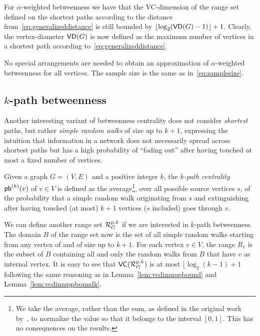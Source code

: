 For $\alpha$-weighted betweenness we have that the VC-dimension of the range set
defined on the shortest paths according to the distance
from~\eqref{eq:generalizeddistance} is still bounded by
$\lfloor\log_2(\mathsf{VD}(G)-1)\rfloor+1$. Clearly, the vertex-diameter $\mathsf{VD}(G)$ is now
defined as the maximum number of vertices in a shortest path according
to~\eqref{eq:generalizeddistance}.

No special arrangements are needed to obtain an approximation of
$\alpha$-weighted betweenness for all vertices. The sample size is the same as in~\eqref{eq:samplesize}.

\subsection{$k$-path betweenness}
Another interesting variant of betweenness centrality does not consider
\emph{shortest} paths, but rather \emph{simple random walks} of size up to
$k+1$, expressing the intuition that information in a network does not
necessarily spread across shortest paths but has a high probability of ``fading
out'' after having touched at most a fixed number of vertices.

\begin{definition}\label{def:kpathbetweenness}
 Given a graph $G=(V,E)$ and a positive integer $k$, the \emph{$k$-path
 centrality} $\mathsf{pb}^{(k)}(v)$ of $v\in V$ is defined as the average\footnote{We take the
 average, rather than the sum, as defined in the original work
 by~\citet{KourtellisASIT12}, to normalize the value so that it belongs to the interval
 $[0,1]$. This has no consequences on the results.}, over all possible source
 vertices $s$, of the probability that a simple random walk originating from
 $s$ and extinguishing after having touched (at most) $k+1$ vertices ($s$
 included) goes through $v$.
\end{definition}

We can define another range set $\mathcal{R}_G^{\mathrm{p},k}$ if we are interested
in $k$-path betweenness. The domain $B$ of the range set now is the set of all
simple random walks starting from any vertex of and of size up to $k+1$. For
each vertex $v\in V$, the range $R_v$ is the subset of $B$ containing all and
only the random walks from $B$ that have $v$ as internal vertex. It is easy to
see that $\mathsf{VC}(\mathcal{R}_G^{\mathrm{p},k})$ is at most $\lfloor\log_2(k-1)+1$
following the same reasoning as in Lemma~\ref{lem:vcdimuppbound} and
Lemma~\ref{lem:vcdimuppboundk}.

